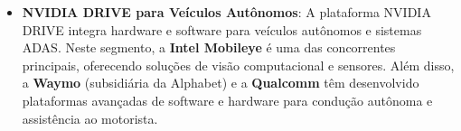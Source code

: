 \begin{itemize}
    \item \textbf{NVIDIA DRIVE para Veículos Autônomos}: A plataforma NVIDIA DRIVE integra hardware e software para veículos autônomos e sistemas ADAS. Neste segmento, a \textbf{Intel Mobileye} é uma das concorrentes principais, oferecendo soluções de visão computacional e sensores. Além disso, a \textbf{Waymo} (subsidiária da Alphabet) e a \textbf{Qualcomm} têm desenvolvido plataformas avançadas de software e hardware para condução autônoma e assistência ao motorista.
\end{itemize}
